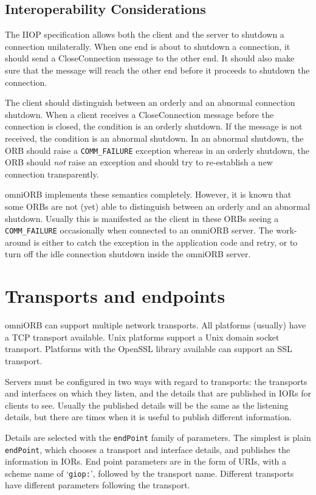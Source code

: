 \documentclass[11pt,twoside,a4paper]{book}
\newcommand{\code}[1]{\texttt{#1}}
\begin{document}
\subsection{Interoperability Considerations}

The IIOP specification allows both the client and the server to
shutdown a connection unilaterally. When one end is about to shutdown
a connection, it should send a CloseConnection message to the other
end. It should also make sure that the message will reach the other
end before it proceeds to shutdown the connection.

The client should distinguish between an orderly and an abnormal
connection shutdown. When a client receives a CloseConnection message
before the connection is closed, the condition is an orderly shutdown.
If the message is not received, the condition is an abnormal shutdown.
In an abnormal shutdown, the ORB should raise a \code{COMM\_FAILURE}
exception whereas in an orderly shutdown, the ORB should \emph{not}
raise an exception and should try to re-establish a new connection
transparently.

omniORB implements these semantics completely. However, it is known
that some ORBs are not (yet) able to distinguish between an orderly
and an abnormal shutdown. Usually this is manifested as the client in
these ORBs seeing a \code{COMM\_FAILURE} occasionally when connected
to an omniORB server. The work-around is either to catch the exception
in the application code and retry, or to turn off the idle connection
shutdown inside the omniORB server.


\section{Transports and endpoints}

omniORB can support multiple network transports. All platforms
(usually) have a TCP transport available. Unix platforms support a
Unix domain socket transport. Platforms with the OpenSSL library
available can support an SSL transport.

Servers must be configured in two ways with regard to transports: the
transports and interfaces on which they listen, and the details that
are published in IORs for clients to see. Usually the published
details will be the same as the listening details, but there are times
when it is useful to publish different information.

Details are selected with the \code{endPoint} family of parameters.
The simplest is plain \code{endPoint}, which chooses a transport and
interface details, and publishes the information in IORs. End point
parameters are in the form of URIs, with a scheme name of
`\code{giop:}', followed by the transport name. Different transports
have different parameters following the transport.
\end{document}
